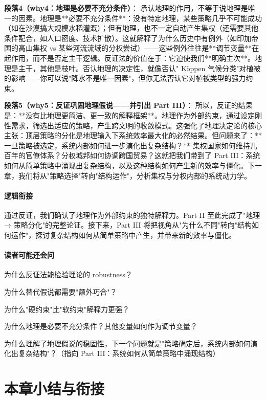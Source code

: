 \documentclass[openany, a4paper, 12pt]{book}
\begin{document}
	\textbf{段落4（why4：地理是必要不充分条件）}：  
	承认地理的作用，不等于说地理是唯一的因素。地理是**必要不充分条件**：没有特定地理，某些策略几乎不可能成功（如在沙漠搞大规模水稻灌溉）；但有地理，也不一定自动产生集权（还需要其他条件配合，如人口密度、技术扩散）。这就解释了为什么历史中有例外（如印加帝国的高山集权 vs 某些河流流域的分权尝试）——这些例外往往是**调节变量**在起作用，而不是否定主干逻辑。反证法的价值在于：它迫使我们**明确主次**。地理是主干，其他是枝叶。否认地理的决定性，就像否认" Köppen 气候分类"对植被的影响——你可以说"降水不是唯一因素"，但你无法否认它对植被类型的强力约束。
	
	\textbf{段落5（why5：反证巩固地理假说——并引出 Part III）}：  
	所以，反证的结果是：**没有比地理更简洁、更一致的解释框架**。地理作为外部约束，通过设定刚性需求，筛选出适应的策略，产生跨文明的收敛模式。这强化了地理决定论的核心主张：顶层策略的分化是地理输入下系统效率最大化的必然结果。但问题来了：**一旦策略被选定，系统内部如何进一步演化出复杂结构？** 集权国家如何维持几百年的官僚体系？分权城邦如何协调跨国贸易？这就把我们带到了 Part III：系统如何从简单策略中涌现出复杂结构，以及这种结构如何产生新的效率与僵化。下一章，我们将从"策略选择"转向"结构运作"，分析集权与分权内部的系统动力学。
	
	\paragraph*{逻辑衔接}
	通过反证，我们确认了地理作为外部约束的独特解释力。Part II 至此完成了"地理 → 策略分化"的完整论证。接下来，Part III 将把视角从"为什么不同"转向"结构如何运作"，探讨复杂结构如何从简单策略中产生，并带来新的效率与僵化。
	
	\paragraph*{读者可能还会问}
	\item 为什么反证法能检验理论的 robustness？
	\item 为什么替代假说都需要"额外巧合"？
	\item 为什么"硬约束"比"软约束"解释力更强？
	\item 为什么地理是必要不充分条件？其他变量如何作为调节变量？
	\item 为什么理解了地理假说的稳固性，下一个问题就是"策略确定后，系统内部如何演化出复杂结构"？（指向 Part III：系统如何从简单策略中涌现结构）
	
	\section{本章小结与衔接}
	
\end{document}
